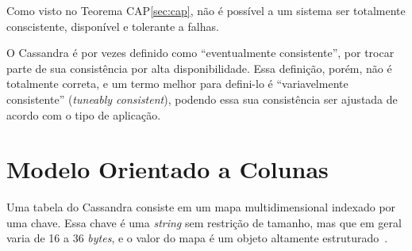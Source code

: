 Como visto no Teorema CAP\ref{sec:cap}, não é possível a um sistema ser totalmente conscistente, disponível e tolerante a falhas. 

O Cassandra é por vezes definido como \enquote{eventualmente consistente}, por trocar parte de sua consistência por alta disponibilidade. Essa definição, porém, não é totalmente correta, e um termo melhor para defini-lo é \enquote{variavelmente consistente} (\emph{tuneably consistent}), podendo essa sua consistência ser ajustada de acordo com o tipo de aplicação.

\section{Modelo Orientado a Colunas}

Uma tabela do Cassandra consiste em um mapa multidimensional indexado por uma chave. Essa chave é uma \emph{string} sem restrição de tamanho, mas que em geral varia de 16 a 36 \emph{bytes}, e o valor do mapa é um objeto altamente estruturado~\cite{lakshmancassandra}.

